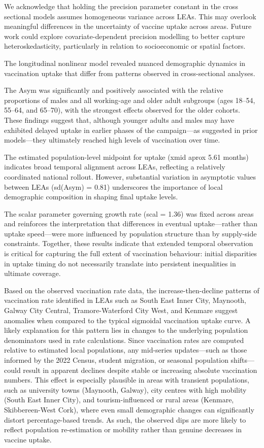 \documentclass{article}
\begin{document}
We acknowledge that holding the precision parameter constant in the
cross sectional models assumes homogeneous variance across LEAs. This
may overlook meaningful differences in the uncertainty of vaccine uptake
across areas. Future work could explore covariate-dependent precision
modelling to better capture heteroskedasticity, particularly in relation
to socioeconomic or spatial factors.

The longitudinal nonlinear model revealed nuanced demographic dynamics
in vaccination uptake that differ from patterns observed in
cross-sectional analyses.

The Asym was significantly and positively associated with the relative
proportions of males and all working-age and older adult subgroups (ages
18--54, 55--64, and 65--70), with the strongest effects observed for the
older cohorts. These findings suggest that, although younger adults and
males may have exhibited delayed uptake in earlier phases of the
campaign---as suggested in prior models---they ultimately reached high
levels of vaccination over time.

The estimated population-level midpoint for uptake (xmid aprox 5.61
months) indicates broad temporal alignment across LEAs, reflecting a
relatively coordinated national rollout. However, substantial variation
in asymptotic values between LEAs (sd(Asym) = 0.81) underscores the
importance of local demographic composition in shaping final uptake
levels.

The scalar parameter governing growth rate (scal = 1.36) was fixed
across areas and reinforces the interpretation that differences in
eventual uptake---rather than uptake speed---were more influenced by
population structure than by supply-side constraints. Together, these
results indicate that extended temporal observation is critical for
capturing the full extent of vaccination behaviour: initial disparities
in uptake timing do not necessarily translate into persistent
inequalities in ultimate coverage.

Based on the observed vaccination rate data, the increase-then-decline
patterns of vaccination rate identified in LEAs such as South East Inner
City, Maynooth, Galway City Central, Tramore-Waterford City West, and
Kenmare suggest anomalies when compared to the typical sigmoidal
vaccination uptake curve. A likely explanation for this pattern lies in
changes to the underlying population denominators used in rate
calculations. Since vaccination rates are computed relative to estimated
local populations, any mid-series updates---such as those informed by
the 2022 Census, student migration, or seasonal population
shifts---could result in apparent declines despite stable or increasing
absolute vaccination numbers. This effect is especially plausible in
areas with transient populations, such as university towns (Maynooth,
Galway), city centres with high mobility (South East Inner City), and
tourism-influenced or rural areas (Kenmare, Skibbereen-West Cork), where
even small demographic changes can significantly distort
percentage-based trends. As such, the observed dips are more likely to
reflect population re-estimation or mobility rather than genuine
decreases in vaccine uptake.
\end{document}
